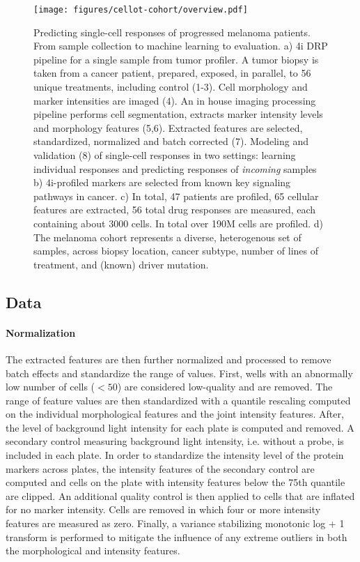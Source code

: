 \begin{figure}[h!]
  \centering
  \texttt{[image: figures/cellot-cohort/overview.pdf]}
  \caption{
    Predicting single-cell responses of progressed melanoma patients.
    From sample collection to machine learning to evaluation.
    a) 4i DRP pipeline for a single sample from tumor profiler.
    A tumor biopsy is taken from a cancer patient, prepared,
    exposed, in parallel, to 56 unique treatments, including control (1-3).
    Cell morphology and marker intensities are imaged (4).
    An in house imaging processing pipeline performs cell segmentation,
    extracts marker intensity levels and morphology features (5,6).
    Extracted features are selected, standardized, normalized and batch corrected (7).
    Modeling and validation (8) of single-cell responses in two settings: learning individual responses and predicting responses of \emph{incoming} samples
    b) 4i-profiled markers are selected from known key signaling pathways in cancer.
    c) In total, 47 patients are profiled, 65 cellular features are extracted, 56 total drug responses are measured, each containing about 3000 cells. In total over 190M cells are profiled.
    d) The melanoma cohort represents a diverse, heterogenous set of samples,
    across biopsy location, cancer subtype, number of lines of treatment, and (known) driver mutation.
  }\label{fig:cellot-cohort-overview}
\end{figure}

\subsection{Data}

\paragraph{Normalization}
The extracted features are then further normalized and processed to remove batch effects and standardize the range of values. First, wells with an abnormally low number of cells ($< 50$) are considered low-quality and are removed.
The range of feature values are then standardized with a quantile rescaling computed on the individual morphological features and the joint intensity features.
After, the level of background light intensity for each plate is computed and removed.
A secondary control measuring background light intensity, i.e. without a probe, is included in each plate. 
In order to standardize the intensity level of the protein markers across plates, the intensity features of the secondary control are computed and cells on the plate with intensity features below the 75th quantile are clipped.
An additional quality control is then applied to cells that are inflated for no marker intensity.
Cells are removed in which four or more intensity features are measured as zero.
Finally, a variance stabilizing monotonic log + 1 transform is performed to mitigate the influence of any extreme outliers in both the morphological and intensity features.

